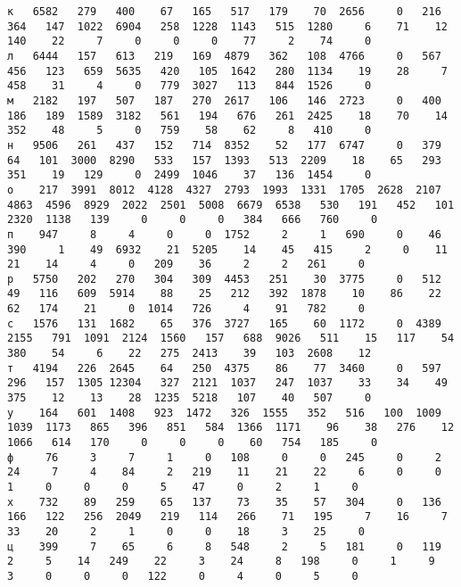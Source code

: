 \documentclass{article}
\begin{document}
\begin{landscape}
\begin{addmargin}{0em}
\begin{verbatim}
к   6582   279   400    67   165   517   179    70  2656     0   216   364   147  1022  6904   258  1228  1143   515  1280     6    71    12   140    22     7     0     0     0    77     2    74     0
л   6444   157   613   219   169  4879   362   108  4766     0   567   456   123   659  5635   420   105  1642   280  1134    19    28     7   458    31     4     0   779  3027   113   844  1526     0
м   2182   197   507   187   270  2617   106   146  2723     0   400   186   189  1589  3182   561   194   676   261  2425    18    70    14   352    48     5     0   759    58    62     8   410     0
н   9506   261   437   152   714  8352    52   177  6747     0   379    64   101  3000  8290   533   157  1393   513  2209    18    65   293   351    19   129     0  2499  1046    37   136  1454     0
о    217  3991  8012  4128  4327  2793  1993  1331  1705  2628  2107  4863  4596  8929  2022  2501  5008  6679  6538   530   191   452   101  2320  1138   139     0     0     0   384   666   760     0
п    947     8     4     0     0  1752     2     1   690     0    46   390     1    49  6932    21  5205    14    45   415     2     0    11    21    14     4     0   209    36     2     2   261     0
р   5750   202   270   304   309  4453   251    30  3775     0   512    49   116   609  5914    88    25   212   392  1878    10    86    22    62   174    21     0  1014   726     4    91   782     0
с   1576   131  1682    65   376  3727   165    60  1172     0  4389  2155   791  1091  2124  1560   157   688  9026   511    15   117    54   380    54     6    22   275  2413    39   103  2608    12
т   4194   226  2645    64   250  4375    86    77  3460     0   597   296   157  1305 12304   327  2121  1037   247  1037    33    34    49   375    12    13    28  1235  5218   107    40   507     0
у    164   601  1408   923  1472   326  1555   352   516   100  1009  1039  1173   865   396   851   584  1366  1171    96    38   276    12  1066   614   170     0     0     0    60   754   185     0
ф     76     3     7     1     0   108     0     0   245     0     2    24     7     4    84     2   219    11    21    22     6     0     0     1     0     0     0     5    47     0     2     1     0
х    732    89   259    65   137    73    35    57   304     0   136   166   122   256  2049   219   114   266    71   195     7    16     7    33    20     2     1     0     0    18     3    25     0
ц    399     7    65     6     8   548     2     5   181     0   119     2     5    14   249    22     3    24     8   198     0     1     9     3     0     0     0   122     0     4     0     5     0

\end{verbatim}
\end{addmargin}
\end{landscape}
\end{document}
